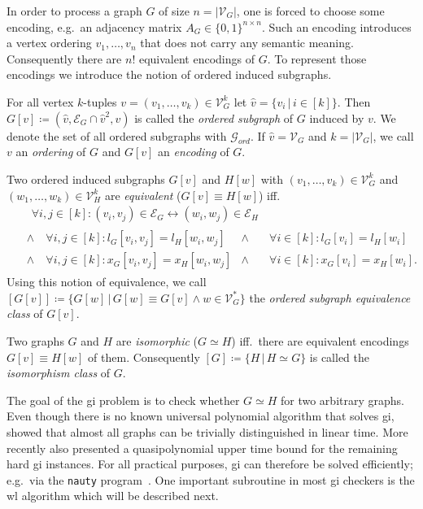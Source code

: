 In order to process a graph $G$ of size $n = |\mathcal{V}_G|$, one is forced to choose some encoding, e.g.\ an adjacency matrix $A_G \in {\{0, 1\}}^{n \times n}$.
Such an encoding introduces a vertex ordering $v_1, \dots, v_n$ that does not carry any semantic meaning.
Consequently there are $n!$ equivalent encodings of $G$. %
To represent those encodings we introduce the notion of ordered induced subgraphs.
\begin{defn}\label{defn:related:ordered-subgraph}
	For all vertex $k$-tuples $v = (v_1, \dots, v_k) \in \mathcal{V}_G^k$ let $\hat{v} = \{ v_i\, |\, i \in [k] \}$.
	Then $G[v] \coloneqq (\hat{v}, \mathcal{E}_G \cap \hat{v}^2, v)$ is called the \textit{ordered subgraph} of $G$ induced by $v$.
	We denote the set of all ordered subgraphs with $\mathcal{G}_{\mathit{ord}}$.
	If $\hat{v} = \mathcal{V}_G$ and $k = |\mathcal{V}_G|$, we call $v$ an \textit{ordering} of $G$ and $G[v]$ an \textit{encoding} of $G$.
\end{defn}
\begin{defn}\label{defn:related:ordered-subgraph-equivalence}
	Two ordered induced subgraphs $G[v]$ and $H[w]$ with $(v_1, \dots, v_k) \in \mathcal{V}_G^k$ and $(w_1, \dots, w_k) \in \mathcal{V}_H^k$ are \textit{equivalent} ($G[v] \equiv H[w]$) iff.\
	\begin{align*}
		&\quad\forall i, j \in [k]: (v_i, v_j) \in \mathcal{E}_G \leftrightarrow (w_i, w_j) \in \mathcal{E}_H \\
		&\, \begin{aligned}
			\land&\ \forall i, j \in [k]: l_G[v_i, v_j] = l_H[w_i, w_j] &\land&\quad\forall i \in [k]: l_G[v_i] = l_H[w_i] \\
			\land&\ \forall i, j \in [k]: x_G[v_i, v_j] = x_H[w_i, w_j] &\land&\quad\forall i \in [k]: x_G[v_i] = x_H[w_i]\text{.}
		\end{aligned}
	\end{align*}
	Using this notion of equivalence, we call ${\left[ G[v] \right]} \coloneqq \{ G[w]\, |\, G[w] \equiv G[v] \land w \in \mathcal{V}_G^{*} \}$ the \textit{ordered subgraph equivalence class} of $G[v]$.
\end{defn}
\begin{defn}
	Two graphs $G$ and $H$ are \textit{isomorphic} ($G \simeq H$) iff.\ there are equivalent encodings $G[v] \equiv H[w]$ of them.
	Consequently $[G] \coloneqq \{ H\, |\, H \simeq G \}$ is called the \textit{isomorphism class} of $G$.
\end{defn}
The goal of the \ac{gi} problem is to check whether $G \simeq H$ for two arbitrary graphs.
Even though there is no known universal polynomial algorithm that solves \ac{gi}, \citet{Babai1980} showed that almost all graphs can be trivially distinguished in linear time.
More recently \citet{Babai2015} also presented a quasipolynomial upper time bound for the remaining hard \ac{gi} instances.
For all practical purposes, \ac{gi} can therefore be solved efficiently; e.g.\ via the \texttt{nauty} program~\cite{McKay}\cite{McKay2013}.
One important subroutine in most \ac{gi} checkers is the \acl{wl} algorithm which will be described next.


